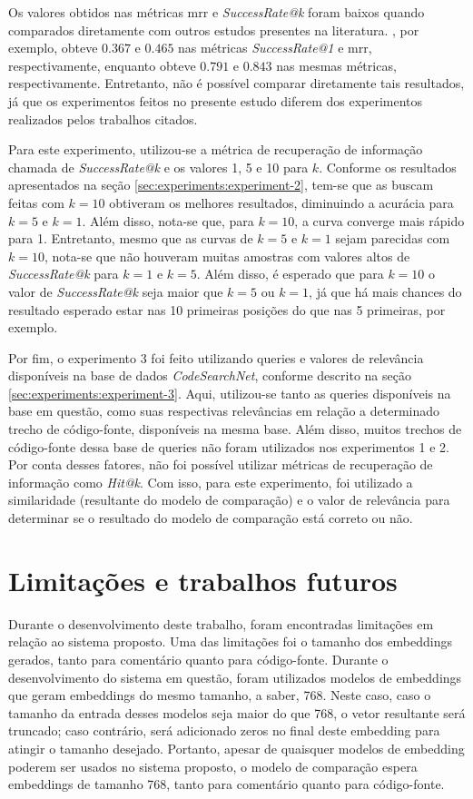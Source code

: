 Os valores obtidos nas métricas \gls{mrr} e \textit{SuccessRate@k} foram baixos quando comparados diretamente com outros estudos presentes na literatura. \textcite{Gu2018DeepCS}, por exemplo, obteve $0.367$ e $0.465$ nas métricas \textit{SuccessRate@1} e \gls{mrr}, respectivamente, enquanto \textcite{Gu2021CRaDLeDC} obteve $0.791$ e $0.843$ nas mesmas métricas, respectivamente. Entretanto, não é possível comparar diretamente tais resultados, já que os experimentos feitos no presente estudo diferem dos experimentos realizados pelos trabalhos citados.

Para este experimento, utilizou-se a métrica de recuperação de informação chamada de \textit{SuccessRate@k} e os valores 1, 5 e 10 para $k$. Conforme os resultados apresentados na seção \ref{sec:experiments:experiment-2}, tem-se que as buscam feitas com $k=10$ obtiveram os melhores resultados, diminuindo a acurácia para $k=5$ e $k=1$. Além disso, nota-se que, para $k=10$, a curva converge mais rápido para 1. Entretanto, mesmo que as curvas de $k=5$ e $k=1$ sejam parecidas com $k=10$, nota-se que não houveram muitas amostras com valores altos de \textit{SuccessRate@k} para $k=1$ e $k=5$. Além disso, é esperado que para $k=10$ o valor de \textit{SuccessRate@k} seja maior que $k=5$ ou $k=1$, já que há mais chances do resultado esperado estar nas 10 primeiras posições do que nas 5 primeiras, por exemplo.

Por fim, o experimento 3 foi feito utilizando queries e valores de relevância disponíveis na base de dados \textit{CodeSearchNet}, conforme descrito na seção \ref{sec:experiments:experiment-3}. Aqui, utilizou-se tanto as queries disponíveis na base em questão, como suas respectivas relevâncias em relação a determinado trecho de código-fonte, disponíveis na mesma base. Além disso, muitos trechos de código-fonte dessa base de queries não foram utilizados nos experimentos 1 e 2. Por conta desses fatores, não foi possível utilizar métricas de recuperação de informação como \textit{Hit@k}. Com isso, para este experimento, foi utilizado a similaridade (resultante do modelo de comparação) e o valor de relevância para determinar se o resultado do modelo de comparação está correto ou não.

\section{Limitações e trabalhos futuros}
\label{sec:discussions:future-works}

Durante o desenvolvimento deste trabalho, foram encontradas limitações em relação ao sistema proposto. Uma das limitações foi o tamanho dos embeddings gerados, tanto para comentário quanto para código-fonte. Durante o desenvolvimento do sistema em questão, foram utilizados modelos de embeddings que geram embeddings do mesmo tamanho, a saber, 768. Neste caso, caso o tamanho da entrada desses modelos seja maior do que 768, o vetor resultante será truncado; caso contrário, será adicionado zeros no final deste embedding para atingir o tamanho desejado. Portanto, apesar de quaisquer modelos de embedding poderem ser usados no sistema proposto, o modelo de comparação espera embeddings de tamanho 768, tanto para comentário quanto para código-fonte. 


